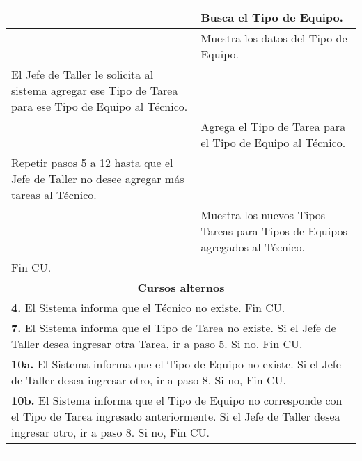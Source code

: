 \documentclass[12pt]{extarticle}
\begin{document}
\begin{longtable}{ |p{8cm}|p{8cm}| }
			\hline
			& \inc Busca el Tipo de Equipo.\\
			\hline
			& \inc Muestra los datos del Tipo de Equipo. \\
			\hline
			\inc  El Jefe de Taller le solicita al sistema agregar ese Tipo de Tarea para ese Tipo de Equipo al Técnico. & \\
			\hline
			& \inc Agrega el Tipo de Tarea para el Tipo de Equipo al Técnico. \\
			\hline
			\inc  Repetir pasos 5 a 12 hasta que el Jefe de Taller no desee agregar más tareas al Técnico. & \\
			\hline
			& \inc Muestra los nuevos Tipos Tareas para Tipos de Equipos agregados al Técnico. \\
			\hline
			\inc Fin CU. & \\
		\hline
		\multicolumn{2}{|c|}{\textbf{Cursos alternos}}\\
		\hline
		\multicolumn{2}{|p{16cm}|}{\textbf{4. } El Sistema informa que el Técnico no existe. Fin CU.}\\
		\hline
		\multicolumn{2}{|p{16cm}|}{\textbf{7. } El Sistema informa que el Tipo de Tarea no existe. Si el Jefe de Taller desea ingresar otra Tarea, ir a paso 5. Si no, Fin CU.}\\
		\hline
		\multicolumn{2}{|p{16cm}|}{\textbf{10a. } El Sistema informa que el Tipo de Equipo no existe. Si el Jefe de Taller desea ingresar otro, ir a paso 8. Si no, Fin CU.}\\
		\hline	
		\multicolumn{2}{|p{16cm}|}{\textbf{10b. } El Sistema informa que el Tipo de Equipo no corresponde con el Tipo de Tarea ingresado anteriormente. Si el Jefe de Taller desea ingresar otro, ir a paso 8. Si no, Fin CU.}\\
		\hline	
	\end{longtable}

    \resetinc
\noindent\rule{169mm}{0.8mm}\\
\end{document}
